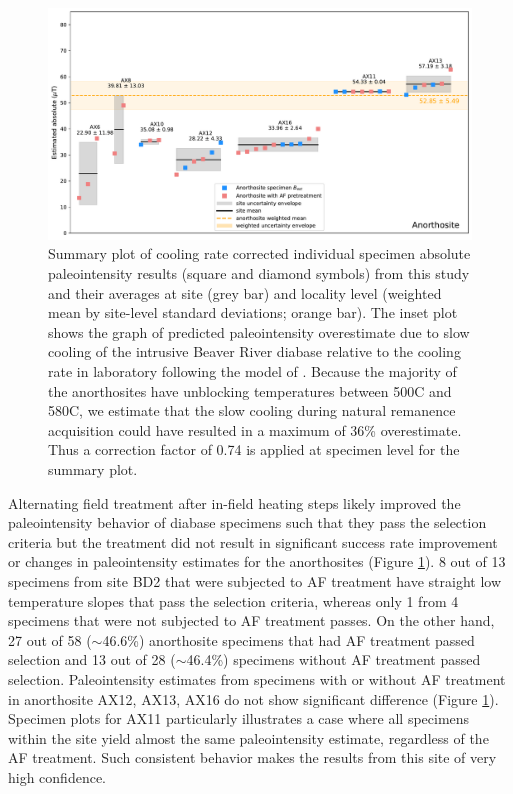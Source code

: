 \documentclass[draft]{agujournal2019}
\begin{document}
\begin{figure}[h!]
\noindent\includegraphics[width=\textwidth]{Paleointensity_plot_cooling_corrected.pdf}
\centering
\caption{\small{Summary plot of cooling rate corrected individual specimen absolute paleointensity results (square and diamond symbols) from this study and their averages at site (grey bar) and locality level (weighted mean by site-level standard deviations; orange bar). The inset plot shows the graph of predicted paleointensity overestimate due to slow cooling of the intrusive Beaver River diabase relative to the cooling rate in laboratory following the model of . Because the majority of the anorthosites have unblocking temperatures between 500\textdegree C and 580\textdegree C, we estimate that the slow cooling during natural remanence acquisition could have resulted in a maximum of 36\% overestimate. Thus a correction factor of 0.74 is applied at specimen level for the summary plot.  }}
\label{fig:PINT_cooling_corrected}
\end{figure}

Alternating field treatment after in-field heating steps likely improved the paleointensity behavior of diabase specimens such that they pass the selection criteria but the treatment did not result in significant success rate improvement or changes in paleointensity estimates for the anorthosites (Figure \ref{fig:PINT_cooling_corrected}). 8 out of 13 specimens from site BD2 that were subjected to AF treatment have straight low temperature slopes that pass the selection criteria, whereas only 1 from 4 specimens that were not subjected to AF treatment passes. On the other hand, 27 out of 58 ($\sim$46.6\%) anorthosite specimens that had AF treatment passed selection and 13 out of 28 ($\sim$46.4\%) specimens without AF treatment passed selection. Paleointensity estimates from specimens with or without AF treatment in anorthosite AX12, AX13, AX16 do not show significant difference (Figure \ref{fig:PINT_cooling_corrected}). Specimen plots for AX11 particularly illustrates a case where all specimens within the site yield almost the same paleointensity estimate, regardless of the AF treatment. Such consistent behavior makes the results from this site of very high confidence. 
\end{document}
